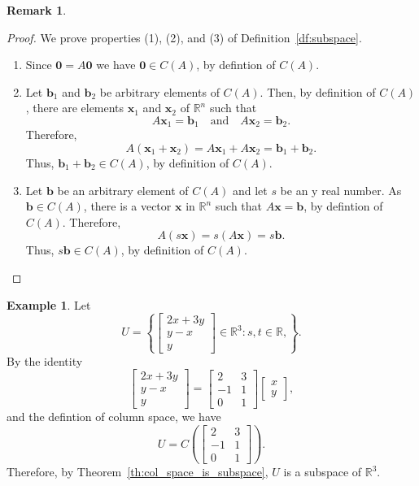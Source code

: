 \documentclass[12pt]{amsart}
\newcommand{\RR}{\mathbb{R}}
\theoremstyle{definition} \newtheorem{definition}[theorem]{Definition}
\newtheorem{remark}[theorem]{Remark} \newtheorem{remarks}[theorem]{Remarks}
\newtheorem{example}[theorem]{Example}
\newcommand{\bb}{\mathbf{b}}
\newcommand{\bx}{\mathbf{x}}
\newcommand{\bzero}{\mathbf{0}}
\newcommand{\mat}[1]{\begin{bmatrix}#1\end{bmatrix}}
\begin{document}
\begin{remark}
\begin{proof} We prove properties (1), (2), and (3) of Definition~\ref{df:subspace}.
  \begin{enumerate}
    \item Since $\bzero = A\bzero$ we have $\bzero\in C(A)$, by defintion of $C(A)$.
    \item Let $\bb_1$ and $\bb_2$ be arbitrary elements of $C(A)$. Then, by definition of $C(A)$, there are elements $\bx_1$ and $\bx_2$ of $\RR^n$ such that
      \[
        A\bx_1=\bb_1\quad\text{and}\quad A\bx_2=\bb_2.
      \]
      Therefore,
      \[
        A(\bx_1+\bx_2) = A\bx_1 + A\bx_2 = \bb_1 + \bb_2.
      \]
      Thus, $\bb_1+\bb_2\in C(A)$, by definition of $C(A)$.
    \item Let $\bb$ be an arbitrary element of $C(A)$ and let $s$ be an y real number.
      As $\bb\in C(A)$, there is a vector $\bx$ in $\RR^n$ such that $A\bx=\bb$, by defintion of $C(A)$.
      Therefore,
      \[
        A(s\bx) = s(A\bx) = s\bb.
      \]
      Thus, $s\bb\in C(A)$, by definition of $C(A)$.\qedhere
  \end{enumerate}
\end{proof}

\begin{example}
  Let
  \[
    U =\left\{\mat{2x+3y\\y-x\\y}\in\RR^3 : s, t\in\RR,\right\}.
  \]
  By the identity
  \[
    \mat{2x+3y\\y-x\\y} = \mat{2&3\\-1&1\\0&1}\mat{x\\y},
  \]
  and the defintion of column space, we have
  \[
    U = C\left(\mat{2&3\\-1&1\\0&1}\right).
  \]
  Therefore, by Theorem~\ref{th:col_space_is_subspace}, $U$ is a subspace of $\RR^3$.
\end{example}


\end{remark}
\end{document}
